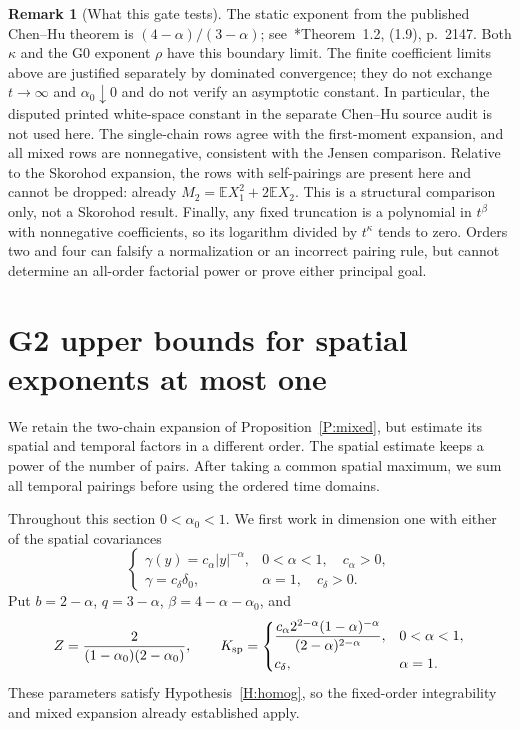 \documentclass[12pt]{article}
\numberwithin{equation}{section}
\theoremstyle{definition}
\newtheorem{remark}[theorem]{Remark}
\newcommand{\E}{\mathbb{E}}
\begin{document}
\begin{remark}[What this gate tests]\label{R:G1-scope}
  The static exponent from the published Chen--Hu theorem is
  $(4-\alpha)/(3-\alpha)$; see~\cite{chen.hu:25:hyperbolic}*{Theorem~1.2,
  (1.9), p.~2147}. Both $\kappa$ and the G0 exponent $\rho$ have this
  boundary limit. The finite coefficient limits above are justified
  separately by dominated convergence; they do not exchange
  $t\to\infty$ and $\alpha_0\downarrow0$ and do not verify an
  asymptotic constant. In particular, the disputed printed white-space
  constant in the separate Chen--Hu source audit is not used here.
  The single-chain rows agree with the first-moment expansion, and all
  mixed rows are nonnegative, consistent with the Jensen comparison.
  Relative to the Skorohod expansion, the rows with self-pairings are present
  here and cannot be dropped: already $M_2=\E X_1^2+2\E X_2$.
  This is a structural comparison only, not a Skorohod result.
  Finally, any fixed truncation is a polynomial in $t^\beta$ with
  nonnegative coefficients, so its logarithm divided by $t^\kappa$
  tends to zero. Orders two and four can falsify a normalization or an
  incorrect pairing rule, but cannot determine an all-order factorial
  power or prove either principal goal.
\end{remark}

\section{G2 upper bounds for spatial exponents at most one}\label{S:d1-upper}


We retain the two-chain expansion of Proposition~\ref{P:mixed}, but
estimate its spatial and temporal factors in a different order. The
spatial estimate keeps a power of the number of pairs. After taking a
common spatial maximum, we sum all temporal pairings before using the
ordered time domains.

Throughout this section $0<\alpha_0<1$. We first work in dimension one
with either of the spatial covariances
\begin{equation}\label{E:d1-covariances}
  \begin{cases}
    \gamma(y)=c_\alpha|y|^{-\alpha},&0<\alpha<1,\quad c_\alpha>0,\\
    \gamma=c_\delta\delta_0,&\alpha=1,\quad c_\delta>0.
  \end{cases}
\end{equation}
Put $b=2-\alpha$, $q=3-\alpha$, $\beta=4-\alpha-\alpha_0$, and
\begin{equation}\label{E:d1-constants}
  Z=\frac{2}{(1-\alpha_0)(2-\alpha_0)},\qquad
  K_{\rm sp}=
  \begin{cases}
    \displaystyle\frac{c_\alpha 2^{2-\alpha}(1-\alpha)^{-\alpha}}
    {(2-\alpha)^{2-\alpha}},&0<\alpha<1,\\[2mm]
    c_\delta,&\alpha=1.
  \end{cases}
\end{equation}
These parameters satisfy Hypothesis~\ref{H:homog}, so the fixed-order
integrability and mixed expansion already established apply.
\end{document}
